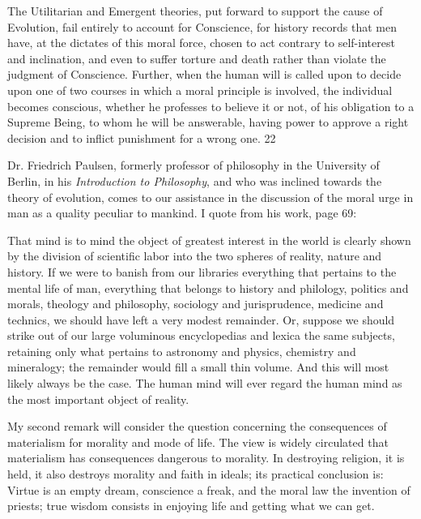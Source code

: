 The Utilitarian and Emergent theories, put forward to support the cause of Evolution, fail
entirely to account for Conscience, for history records that men have, at the dictates of this
moral force, chosen to act contrary to self-interest and inclination, and even to suffer torture
and death rather than violate the judgment of Conscience. Further, when the human will is
called upon to decide upon one of two courses in which a moral principle is involved, the
individual becomes conscious, whether he professes to believe it or not, of his obligation to a
Supreme Being, to whom he will be answerable, having power to approve a right decision
and to inflict punishment for a wrong one. 22

Dr. Friedrich Paulsen, formerly professor of philosophy in the University of Berlin, in his
\textit{Introduction to Philosophy}, and who was inclined towards the theory of evolution, comes to
our assistance in the discussion of the moral urge in man as a quality peculiar to mankind. I
quote from his work, page 69:

That mind is to mind the object of greatest interest in the world is clearly shown by the
division of scientific labor into the two spheres of reality, nature and history. If we were to
banish from our libraries everything that pertains to the mental life of man, everything that
belongs to history and philology, politics and morals, theology and philosophy, sociology
and jurisprudence, medicine and technics, we should have left a very modest remainder. Or,
suppose we should strike out of our large voluminous encyclopedias and lexica the same
subjects, retaining only what pertains to astronomy and physics, chemistry and mineralogy;
the remainder would fill a small thin volume. And this will most likely always be the case.
The human mind will ever regard the human mind as the most important object of reality.

My second remark will consider the question concerning the consequences of materialism for
morality and mode of life. The view is widely circulated that materialism has consequences
dangerous to morality. In destroying religion, it is held, it also destroys morality and faith in
ideals; its practical conclusion is: Virtue is an empty dream, conscience a freak, and the
moral law the invention of priests; true wisdom consists in enjoying life and getting what we
can get.

